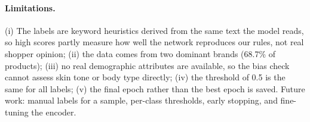 \paragraph{Limitations.} (i) The labels are keyword heuristics derived from the same text the model reads, so high scores partly measure how well the network reproduces our rules, not real shopper opinion; (ii) the data comes from two dominant brands (68.7\% of products); (iii) no real demographic attributes are available, so the bias check cannot assess skin tone or body type directly; (iv) the threshold of 0.5 is the same for all labels; (v) the final epoch rather than the best epoch is saved. Future work: manual labels for a sample, per-class thresholds, early stopping, and fine-tuning the encoder.